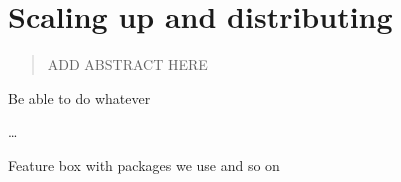 \chapter{Scaling up and distributing}
\label{chap:scalingup}

\begin{abstract}
ADD ABSTRACT HERE
\end{abstract}



\begin{objectives}
\item Be able to do whatever
\item \ldots
\end{objectives}

\begin{feature}
Feature box with packages we use and so on
\end{feature}









